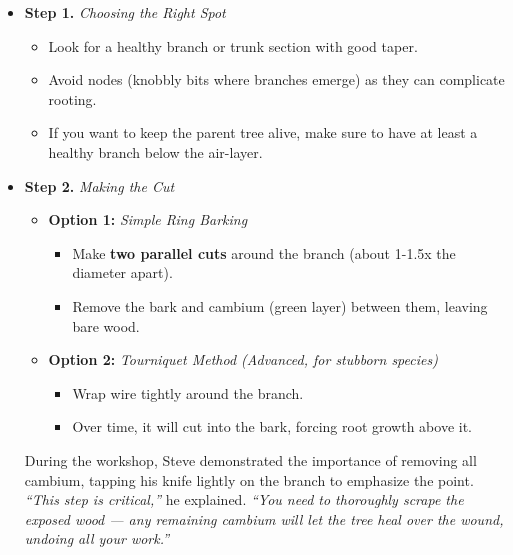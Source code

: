 \begin{itemize}
    \item \textbf{Step 1.} \textit{Choosing the Right Spot}
    \begin{itemize}
        \item Look for a healthy branch or trunk section with good taper.
        
        \item Avoid nodes (knobbly bits where branches emerge) as they can complicate rooting.

        \item If you want to keep the parent tree alive, make sure to have at least a healthy branch below the air\--layer.
    \end{itemize}

    \item \textbf{Step 2.} \textit{Making the Cut}
    \begin{itemize}
        \item \textbf{Option 1:} \textit{Simple Ring Barking}
        \begin{itemize}
            \item[\tiny$\blacksquare$] Make \textbf{two parallel cuts} around the branch (about 1\--1.5x the diameter apart).
        
            \item[\tiny$\blacksquare$] Remove the bark and cambium (green layer) between them, leaving bare wood.
        \end{itemize}

        \item \textbf{Option 2:} \textit{Tourniquet Method (Advanced, for stubborn species)}
        \begin{itemize}
            \item[\tiny$\blacksquare$] Wrap wire tightly around the branch.
        
            \item[\tiny$\blacksquare$] Over time, it will cut into the bark, forcing root growth above it.
        \end{itemize}
    \end{itemize}
    During the workshop, Steve demonstrated the importance of removing all cambium, tapping his knife lightly on the branch to emphasize the point. \textit{``This step is critical,''} he explained. \textit{``You need to thoroughly scrape the exposed wood --- any remaining cambium will let the tree heal over the wound, undoing all your work.''}


\end{itemize}
